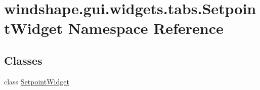\hypertarget{namespacewindshape_1_1gui_1_1widgets_1_1tabs_1_1_setpoint_widget}{}\section{windshape.\+gui.\+widgets.\+tabs.\+Setpoint\+Widget Namespace Reference}
\label{namespacewindshape_1_1gui_1_1widgets_1_1tabs_1_1_setpoint_widget}
\subsection*{Classes}
\begin{DoxyCompactItemize}
\item 
class \mbox{\hyperlink{classwindshape_1_1gui_1_1widgets_1_1tabs_1_1_setpoint_widget_1_1_setpoint_widget}{Setpoint\+Widget}}
\end{DoxyCompactItemize}
